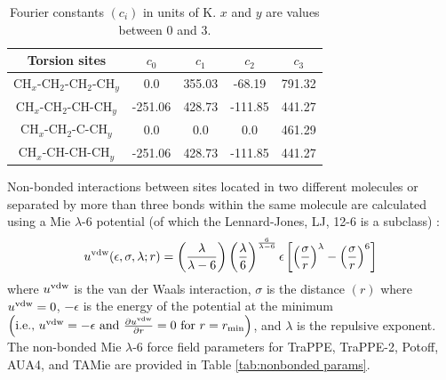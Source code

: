 \documentclass[preprint,review,12pt]{elsarticle}
\begin{document}
	\begin{table}[h!]
		\caption{Fourier constants $(c_i)$ in units of K. $x$ and $y$ are values between 0 and 3.} \label{tab:torsions}
		\begin{center}
			\begin{tabular}{|c|c|c|c|c|}
				\hline
				Torsion sites & $c_0$ & $c_1$ & $c_2$ & $c_3$ \\ \hline
				CH$_x$-CH$_2$-CH$_2$-CH$_y$ & 0.0 & 355.03 & -68.19 & 791.32 \\ 
				CH$_x$-CH$_2$-CH-CH$_y$ & -251.06 & 428.73 & -111.85 & 441.27 \\
				CH$_x$-CH$_2$-C-CH$_y$ & 0.0 & 0.0 & 0.0 & 461.29 \\
				CH$_x$-CH-CH-CH$_y$ & -251.06 & 428.73 & -111.85 & 441.27 \\
				\hline
			\end{tabular}
		\end{center} 
	\end{table}

	Non-bonded interactions between sites located in two different molecules or separated by more than three bonds within the same molecule are calculated using a Mie $\lambda$-6 potential (of which the Lennard-Jones, LJ, 12-6 is a subclass) \cite{Herdes2015}:
	\begin{equation} \label{eq:Mie}
	u^{\rm vdw}(\epsilon,\sigma,\lambda;r) = \left(\frac{\lambda}{\lambda - 6}\right)\left(\frac{\lambda}{6}\right)^{\frac{6}{\lambda - 6}} \epsilon \left[\left(\frac{\sigma}{r}\right)^{\lambda} - \left(\frac{\sigma}{r}\right)^6\right]
	\end{equation} 
	where $u^{\rm vdw}$ is the van der Waals interaction, $\sigma$ is the distance $(r)$ where $u^{\rm vdw} = 0$, $-\epsilon$ is the energy of the potential at the minimum $\left(\text{i.e., }u^{\rm vdw} = -\epsilon \text{ and } \frac{\partial u^{\rm vdw}}{\partial r} = 0 \text{ for } r=r_{\rm min} \right)$, and $\lambda$ is the repulsive exponent. The non-bonded Mie $\lambda$-6 force field parameters for TraPPE, TraPPE-2, Potoff, AUA4, and TAMie are provided in Table \ref{tab:nonbonded params}. 
	
\end{document}
